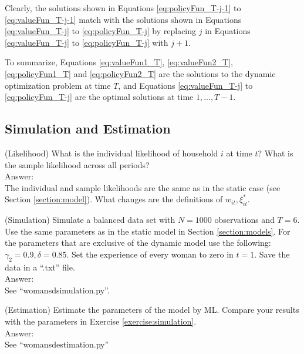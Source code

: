 \indent Clearly, the solutions shown in Equations \eqref{eq:policyFun_T-j-1} to \eqref{eq:valueFun_T-j-1} match with the solutions shown in Equations \eqref{eq:valueFun_T-j} to \eqref{eq:policyFun_T-j} by replacing $j$ in Equations \eqref{eq:valueFun_T-j} to \eqref{eq:policyFun_T-j}  with $j + 1$.   

\indent To summarize, Equations \eqref{eq:valueFun1_T}, \eqref{eq:valueFun2_T}, \eqref{eq:policyFun1_T} and \eqref{eq:policyFun2_T} are the solutions to the dynamic optimization problem at time $T$, and Equations \eqref{eq:valueFun_T-j} to \eqref{eq:policyFun_T-j} are the optimal solutions at time $1, ..., T-1$.

\subsection{Simulation and Estimation}

\begin{exercise} (Likelihood)
What is the individual likelihood of household $i$ at time $t$? What is the sample likelihood across all periods?\\
\noindent Answer:\\
\noindent The individual and sample likelihoods are the same as in the static case (see Section \ref{section:model}). What changes are the definitions of $w_{it}, \xi_{it}^*$.
\end{exercise}

\begin{exercise} (Simulation) \label{exercise:simulation}
Simulate a balanced data set with $N = 1000$ observations and $T=6$. Use the same parameters as in the static model in Section \ref{section:models}. For the parameters that are exclusive of the dynamic model use the following: $\gamma_2 = 0.9,\delta = 0.85$. Set the experience of every woman to zero in $t=1$. Save the data in a ``.txt'' file.\\
\noindent Answer:\\
See ``womansdsimulation.py''.
\end{exercise}

\begin{exercise} (Estimation)
Estimate the parameters of the model by ML. Compare your results with the parameters in Exercise \ref{exercise:simulation}.\\
\noindent Answer:\\
See ``womansdestimation.py''
\end{exercise}